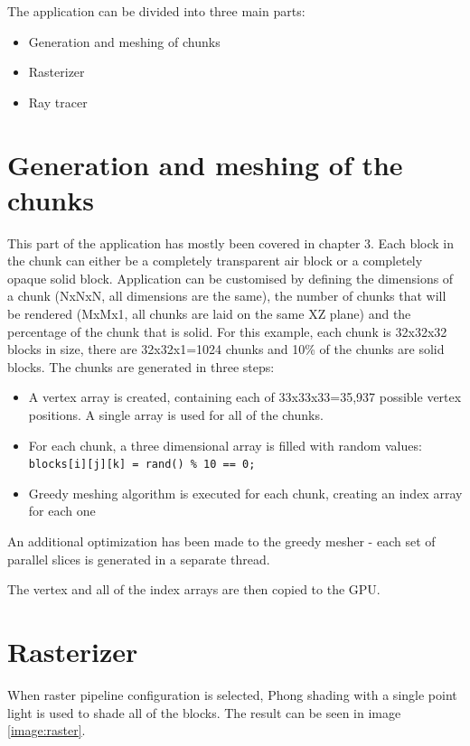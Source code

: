 \documentclass[times, utf8, zavrsni, numeric]{fer}
\begin{document}
The application can be divided into three main parts:
\begin{itemize}
	\item{Generation and meshing of chunks}
	\item{Rasterizer}
	\item{Ray tracer}
\end{itemize}

\section{Generation and meshing of the chunks}
This part of the application has mostly been covered in chapter 3. Each block in the chunk can either be a completely transparent air block or a completely opaque solid block. Application can be customised by defining the dimensions of a chunk (NxNxN, all dimensions are the same), the number of chunks that will be rendered (MxMx1, all chunks are laid on the same XZ plane) and the percentage of the chunk that is solid. For this example, each chunk is 32x32x32 blocks in size, there are 32x32x1=1024 chunks and 10\% of the chunks are solid blocks. The chunks are generated in three steps:
\begin{itemize}
	\item{A vertex array is created, containing each of 33x33x33=35,937 possible vertex positions. A single array is used for all of the chunks.}
	\item{For each chunk, a three dimensional array is filled with random values: \linebreak \texttt{blocks[i][j][k] = rand() \% 10 == 0;}}
	\item{Greedy meshing algorithm is executed for each chunk, creating an index array for each one}
\end{itemize}

An additional optimization has been made to the greedy mesher - each set of parallel slices is generated in a separate thread.

The vertex and all of the index arrays are then copied to the GPU.

\section{Rasterizer}
When raster pipeline configuration is selected, Phong shading with a single point light is used to shade all of the blocks. The result can be seen in image \ref{image:raster}.
\end{document}
